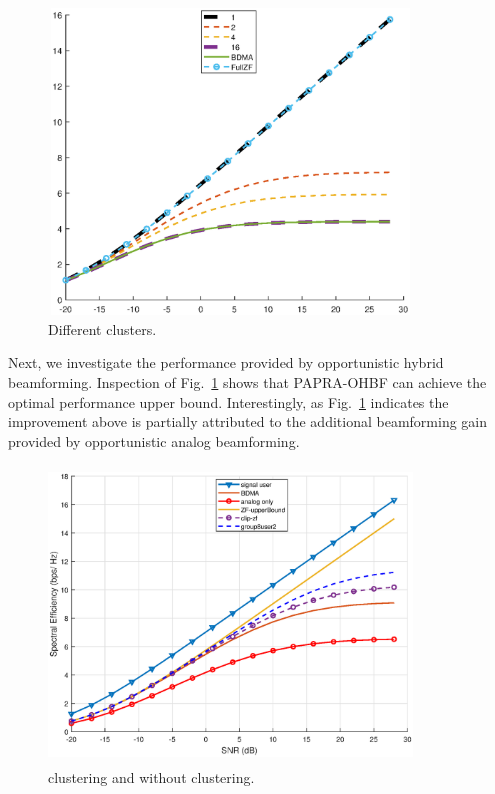 \documentclass[conference]{IEEEtran}
\begin{document}
\begin{figure}[ht]
	\begin{center}
		\includegraphics[width=3.8in,height=3.2in]{Figure/differentK.eps}
		\caption{Different clusters.}\label{fig:SpectralEffWithSelection}
	\end{center}
\end{figure}

Next, we investigate the performance provided by opportunistic hybrid beamforming. Inspection of Fig.~\ref{fig:SpectralEffWithSelection} shows that PAPRA-OHBF can achieve the optimal performance upper bound. Interestingly, as Fig.~\ref{fig:SpectralEffWithSelection} indicates the improvement above is partially attributed to the additional beamforming gain provided by opportunistic analog beamforming.

\begin{figure}[ht]
	\begin{center}
		\includegraphics[width=3.8in,height=3.1in]{Figure/8usercomparisonWithGroup.eps}
		\caption{clustering and without clustering.}\label{fig:MultiuserGain}
	\end{center}
\end{figure}
\end{document}
